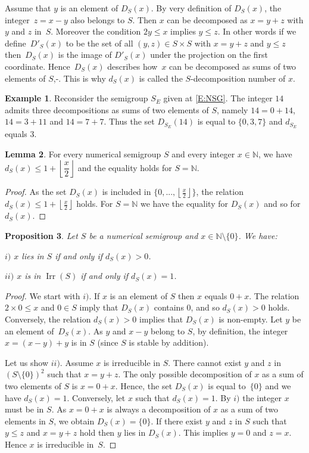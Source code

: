 \documentclass[reqno,11pt]{amsart}
\theoremstyle{plain}
\newtheorem{prop}{Proposition}[section]
\theoremstyle{definition}
\newtheorem{exam}[prop]{Example}
\newtheorem{lem}[prop]{Lemma}
\renewcommand{\leq}{\leqslant}
\newcommand{\NN}{\mathbb{N}}
\DeclareMathOperator{\Irr}{Irr}
\begin{document}
Assume that $y$ is an element of $D_S(x)$.
By very definition of $D_S(x)$, the integer~$z=x-y$ also belongs to $S$. 
Then $x$ can be decomposed as $x=y+z$ with $y$ and $z$ in~$S$. 
Moreover the condition $2y\leq x$ implies $y\leq z$. 
In other words if we define~$D'_S(x)$ to be the set of all $(y,z)\in S\times S$ with $x=y+z$ and $y\leq z$ then~$D_S(x)$ is the image of $D'_S(x)$ under the projection on the first coordinate.
 Hence~$D_S(x)$ describes how~$x$ can be decomposed as sums of two elements of $S$,-.
 This is why $d_S(x)$ is called the $S$-decomposition number of $x$.

\begin{exam}
Reconsider the semigroup $S_E$ given at \eqref{E:NSG}.
The integer $14$ admits three decompositions as sums of two elements of $S$, namely $14=0+14$, $14=3+11$ and $14=7+7$. 
Thus the set $D_{S_E}(14)$ is equal to $\{0,3,7\}$ and $d_{S_E}$ equals $3$.
\end{exam}


\begin{lem}
\label{L:RepN}
For every numerical semigroup $S$ and every integer $x\in \NN$,  we have $d_S(x)\leq 1+\left\lfloor \dfrac{x}2\right\rfloor$ and the equality holds for $S=\NN$.
\end{lem}

\begin{proof}
As the set $D_S(x)$ is included in $\{0,...,\left\lfloor\frac x2\right\rfloor\}$, the relation $d_S(x)\leq 1+\left\lfloor \frac{x}2\right\rfloor$ holds.
For $S=\NN$ we have the equality for $D_S(x)$ and so for $d_S(x)$.
\end{proof}


\begin{prop}
\label{P:Dandd}
Let $S$ be a numerical semigroup and $x\in\NN\setminus\{0\}$.  We have:

 $i)$ $x$ lies in $S$ if and only if $d_S(x)>0$.

 $ii)$ $x$ is in $\Irr(S)$ if and only if $d_S(x)=1$.
\end{prop}

\begin{proof}
We start with $i)$. If $x$ is an element of $S$ then $x$ equals $0+x$. 
The relation~$2\times 0\leq x$ and $0\in S$ imply that $D_S(x)$ contains $0$, and so $d_S(x)>0$ holds.
Conversely, the relation  $d_S(x)>0$  implies that $D_S(x)$ is non-empty. 
Let $y$ be an element of~$D_S(x)$. 
As $y$ and $x-y$ belong to  $S$, by definition, the integer $x=(x-y)+y$ is in $S$  (since $S$ is stable by addition).

Let us show $ii)$. 
Assume $x$ is irreducible in $S$.
There cannot exist $y$ and $z$ in~$(S\setminus\{0\})^2$ such that $x=y+z$. 
The only possible decomposition of $x$ as a sum of two elements of $S$ is $x=0+x$. 
Hence, the set $D_S(x)$ is equal to~$\{0\}$ and we have $d_S(x)=1$. 
Conversely, let $x$ such that $d_S(x)=1$. 
By  $i)$ the  integer $x$ must be in $S$. 
As $x=0+x$ is always a decomposition of $x$ as a sum of two elements in $S$, we obtain $D_S(x)=\{0\}$.
If there exist $y$ and $z$ in $S$ such that $y\leq z$ and $x=y+z$ hold then $y$ lies in $D_S(x)$. 
This implies $y=0$ and $z=x$. 
Hence $x$ is irreducible in~$S$.
\end{proof}
\end{document}

